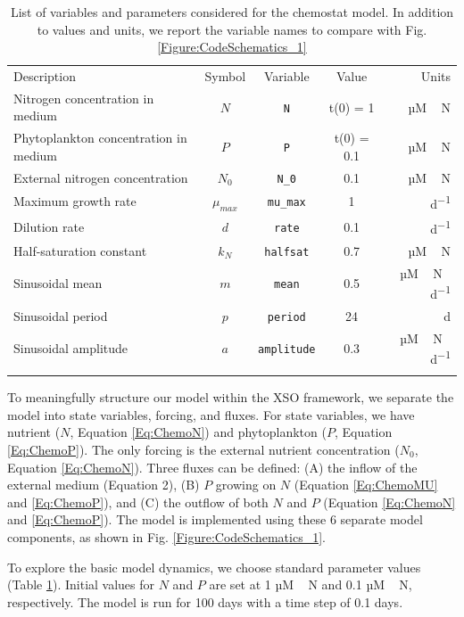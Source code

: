 \documentclass[journal abbreviation, manuscript]{copernicus}
\begin{document}
%
\begin{table}[t]
\caption{List of variables and parameters considered for the chemostat model. In addition to values and units, we report the variable names to compare with Fig. \ref{Figure:CodeSchematics_1}}
\begin{tabular}{l c c c r}
\tophline
Description & Symbol & Variable & Value & Units \\
\middlehline

Nitrogen concentration in medium & $N$ & \texttt{N} & t(0) = 1 & \unit{µM\,N} \\
Phytoplankton concentration in medium & $P$ & \texttt{P} & t(0) = 0.1 & \unit{µM\,N} \\
External nitrogen concentration & $N_0$ & \texttt{N\_0} & 0.1 & \unit{µM\,N} \\
Maximum growth rate & $\mu_{max}$ & \texttt{mu\_max} & 1 & \unit{d^{-1}} \\
Dilution rate & $d$ & \texttt{rate} & 0.1 & \unit{d^{-1}}\\
Half-saturation constant &  $k_N$ & \texttt{halfsat} & 0.7 & \unit{µM\,N}\\

Sinusoidal mean &  $m$ & \texttt{mean} & 0.5 & \unit{µM\,N\,d^{-1}}\\
Sinusoidal period &  $p$ & \texttt{period} & 24 & \unit{d}\\
Sinusoidal amplitude &  $a$ & \texttt{amplitude} & 0.3 & \unit{µM\,N\,d^{-1}}\\

\bottomhline
\end{tabular}
\label{Table:UseCase1Parameters}
\end{table}
%
To meaningfully structure our model within the XSO framework, we separate the model into state variables, forcing, and fluxes. For state variables, we have nutrient ($N$, Equation \ref{Eq:ChemoN}) and phytoplankton ($P$, Equation \ref{Eq:ChemoP}). The only forcing is the external nutrient concentration ($N_0$, Equation \ref{Eq:ChemoN}). Three fluxes can be defined: (A) the inflow of the external medium (Equation 2), (B) $P$ growing on $N$ (Equation \ref{Eq:ChemoMU} and \ref{Eq:ChemoP}), and (C) the outflow of both $N$ and $P$ (Equation \ref{Eq:ChemoN} and \ref{Eq:ChemoP}). The model is implemented using these 6 separate model components, as shown in Fig. \ref{Figure:CodeSchematics_1}.

To explore the basic model dynamics, we choose standard parameter values (Table \ref{Table:UseCase1Parameters}). Initial values for $N$ and $P$ are set at 1 \unit{µM\,N} and 0.1 \unit{µM\,N}, respectively. The model is run for 100 days with a time step of 0.1 days.
\end{document}

